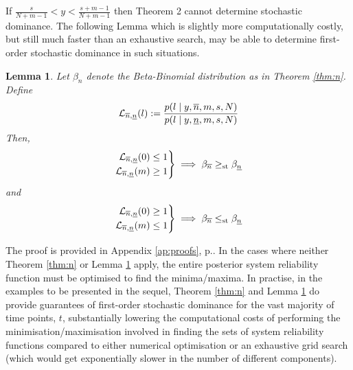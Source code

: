\documentclass[12pt, a4paper]{elsarticle}
\newtheorem{lemma}[theorem]{Lemma}
\begin{document}
If $\frac{s}{N + m - 1} < y < \frac{s + m - 1}{N + m - 1}$ then 
Theorem 2 cannot determine stochastic dominance.  The following Lemma which is slightly
more computationally costly, but still much faster than an exhaustive search, may be able to determine first-order
stochastic dominance in such situations.
\begin{lemma}
  \label{lem:n}
  Let $\beta_n$ denote the Beta-Binomial distribution as in Theorem \ref{thm:n}.  Define
  \[ \mathcal{L}_{\overline{n},\underline{n}}(l) := \frac{p(l \mid y, \overline{n}, m, s, N)}{p(l \mid y, \underline{n}, m, s, N)} \]
  Then,
  \[ \left. \begin{aligned}
       \mathcal{L}_{\overline{n},\underline{n}}(0) \le 1 \\
       \mathcal{L}_{\overline{n},\underline{n}}(m) \ge 1 \\
    \end{aligned} \right\}
    \implies \beta_{\overline{n}} \ge_{\mathrm{st}} \beta_{\underline{n}} \]
  and
  \[ \left. \begin{aligned}
       \mathcal{L}_{\overline{n},\underline{n}}(0) \ge 1 \\
       \mathcal{L}_{\overline{n},\underline{n}}(m) \le 1 \\
    \end{aligned} \right\}
    \implies \beta_{\overline{n}} \le_{\mathrm{st}} \beta_{\underline{n}} \]
\end{lemma}
The proof is provided in Appendix \ref{ap:proofs}, p.\pageref{prf:n2}.
In the cases where neither Theorem \ref{thm:n} or Lemma \ref{lem:n} apply,
the entire posterior system reliability function must be optimised to 
find the minima/maxima.
In practise, in the examples to be presented in the sequel, Theorem 
\ref{thm:n} and Lemma \ref{lem:n} do provide guarantees of first-order
stochastic dominance for the vast majority of time points, $t$,
substantially lowering the computational costs of performing the
minimisation/maximisation involved in finding the sets of system 
reliability functions compared to either numerical optimisation or
an exhaustive grid search (which would get exponentially slower in 
the number of different components).
\end{document}

